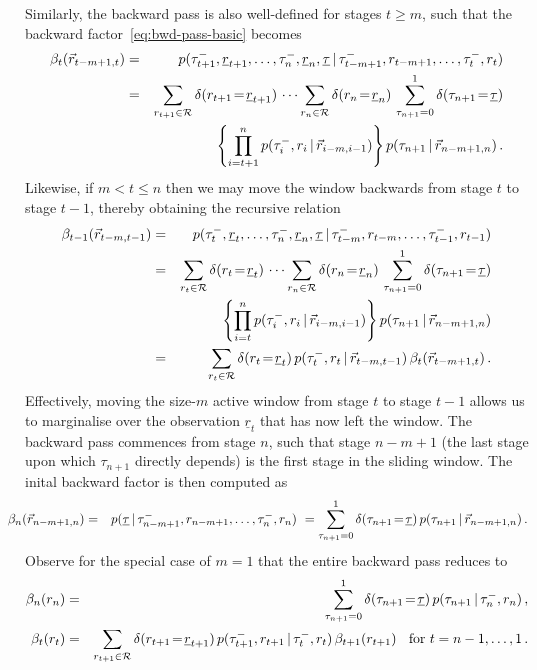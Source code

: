 \documentclass[a4paper]{article}
\newcommand{\ut}{\underline{\tau}}
\newcommand{\ur}{\underline{r}}
\newcommand{\vr}{\vec{r}}
\newcommand{\tm}{\tau^{-}}
\begin{document}
Similarly, the backward pass is also well-defined for stages $t\ge m$, such that the backward factor~\eqref{eq:bwd-pass-basic} becomes
\begin{eqnarray}
\beta_t(\vr_{t-m+1,t}) & = & 
p(\tm_{t+1},\ur_{t+1},\ldots,\tm_n,\ur_n,\ut\,|\,\tm_{t-m+1},r_{t-m+1},\ldots,\tm_t,r_t)
\nonumber\\& = &
\sum_{r_{t+1}\in{\cal R}} \delta(r_{t+1}\!=\!\ur_{t+1})\,\cdots
\sum_{r_{n}\in{\cal R}} \delta(r_{n}\!=\!\ur_{n})\,
\sum_{\tau_{n+1}=0}^{1}\delta(\tau_{n+1}\!=\!\ut)
\nonumber\\
&&{}
\left\{\prod_{i=t+1}^n
p(\tm_{i},r_{i}\,|\,\vr_{i-m,i-1})\right\}
p(\tau_{n+1}\,|\,\vr_{n-m+1,n})
\,.
\end{eqnarray}
Likewise, if $m<t\le n$ then we may move the window backwards from stage $t$ to stage $t-1$, thereby obtaining the recursive relation
\begin{eqnarray}
\beta_{t-1}(\vr_{t-m,t-1}) & = & 
p(\tm_{t},\ur_{t},\ldots,\tm_n,\ur_n,\ut\,|\,\tm_{t-m},r_{t-m},\ldots,\tm_{t-1},r_{t-1})
\nonumber\\& = &
\sum_{r_{t}\in{\cal R}} \delta(r_{t}\!=\!\ur_{t})\,\cdots
\sum_{r_{n}\in{\cal R}} \delta(r_{n}\!=\!\ur_{n})\,
\sum_{\tau_{n+1}=0}^{1}\delta(\tau_{n+1}\!=\!\ut)
\nonumber\\
&&{}
\left\{\prod_{i=t}^n
p(\tm_{i},r_{i}\,|\,\vr_{i-m,i-1})\right\}
p(\tau_{n+1}\,|\,\vr_{n-m+1,n})
\nonumber\\& = &
\sum_{r_{t}\in{\cal R}} \delta(r_{t}\!=\!\ur_{t})\,
p(\tm_{t},r_{t}\,|\,\vr_{t-m,t-1})\,\beta_{t}(\vr_{t-m+1,t})
\,.
\label{eq:bwd-recurse}
\end{eqnarray}
Effectively, moving the size-$m$ active window from stage $t$ to stage $t-1$ allows us to marginalise over the
observation $\ur_{t}$ that has now left the window.
The backward pass commences from stage $n$, such that stage $n-m+1$  (the last stage upon which
$\tau_{n+1}$ directly depends) is the first stage in the sliding window. The inital backward factor is then computed as
\begin{eqnarray}
\hspace*{-5mm}
\beta_n(\vr_{n-m+1,n}) & = & 
p(\ut\,|\,\tm_{n-m+1},r_{n-m+1},\ldots,\tm_n,r_n)
~=
\sum_{\tau_{n+1}=0}^{1}\delta(\tau_{n+1}\!=\!\ut)\,
p(\tau_{n+1}\,|\,\vr_{n-m+1,n})
\label{eq:bwd-m0}
\,.
\end{eqnarray}
Observe for the special case of $m=1$ that the entire backward pass reduces to
\begin{eqnarray}
\beta_n(r_n) & = &  \sum_{\tau_{n+1}=0}^{1}\delta(\tau_{n+1}\!=\!\ut)\,
p(\tau_{n+1}\,|\,\tm_n,r_n)\,,
\nonumber\\
\beta_{t}(r_{t}) & = &
\sum_{r_{t+1}\in{\cal R}} \delta(r_{t+1}\!=\!\ur_{t+1})\,
p(\tm_{t+1},r_{t+1}\,|\,\tm_{t},r_{t})
\,\beta_{t+1}(r_{t+1})\hspace*{2mm}\mbox{ for $t=n-1,\ldots,1$}
\,.
\end{eqnarray}
\end{document}
